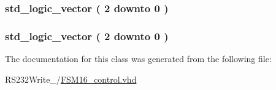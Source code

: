 \subsubsection[{Qn}]{ {\bfseries \textcolor{comment}{std\+\_\+logic\+\_\+vector}\textcolor{vhdlchar}{ }\textcolor{vhdlchar}{(}\textcolor{vhdlchar}{ }\textcolor{vhdlchar}{ } \textcolor{vhdldigit}{2} \textcolor{vhdlchar}{ }\textcolor{keywordflow}{downto}\textcolor{vhdlchar}{ }\textcolor{vhdlchar}{ } \textcolor{vhdldigit}{0} \textcolor{vhdlchar}{ }\textcolor{vhdlchar}{)}\textcolor{vhdlchar}{ }} \hspace{0.3cm}{\ttfamily [Signal]}}\label{class_f_s_m16__control_1_1simple_adcdb7554a5c6665db8acc4f87f8302b5}
\hypertarget{class_f_s_m16__control_1_1simple_ab6f0a475b15145a8fb685b8489e07803}{}
\subsubsection[{Qp}]{ {\bfseries \textcolor{comment}{std\+\_\+logic\+\_\+vector}\textcolor{vhdlchar}{ }\textcolor{vhdlchar}{(}\textcolor{vhdlchar}{ }\textcolor{vhdlchar}{ } \textcolor{vhdldigit}{2} \textcolor{vhdlchar}{ }\textcolor{keywordflow}{downto}\textcolor{vhdlchar}{ }\textcolor{vhdlchar}{ } \textcolor{vhdldigit}{0} \textcolor{vhdlchar}{ }\textcolor{vhdlchar}{)}\textcolor{vhdlchar}{ }} \hspace{0.3cm}{\ttfamily [Signal]}}\label{class_f_s_m16__control_1_1simple_ab6f0a475b15145a8fb685b8489e07803}


The documentation for this class was generated from the following file\+:\begin{DoxyCompactItemize}
\item 
R\+S232\+Write\+\_/\hyperlink{_f_s_m16__control_8vhd}{F\+S\+M16\+\_\+control.\+vhd}\end{DoxyCompactItemize}
